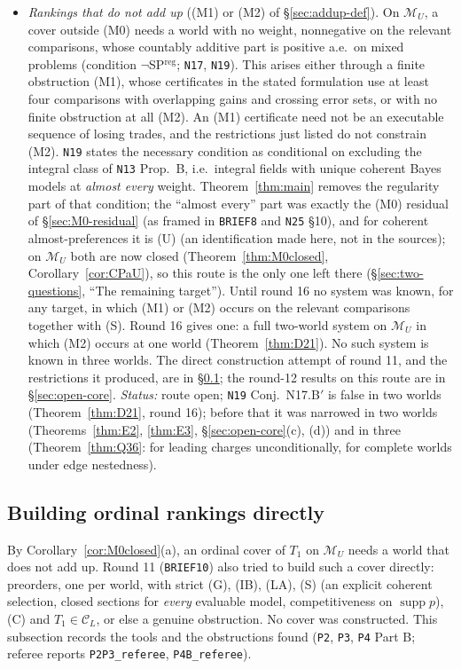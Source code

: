 \documentclass[11pt]{article}
\theoremstyle{definition}
\theoremstyle{remark}
\newcommand{\M}{\mathcal M}
\newcommand{\C}{\mathcal C}
\newcommand{\supp}{\operatorname{supp}}
\newcommand{\src}[1]{\texttt{#1}}
\begin{document}
\begin{itemize}[leftmargin=*]
\item \emph{Rankings that do not add up} ((M1) or (M2) of \S\ref{sec:addup-def}). On $\M_U$, a cover outside (M0) needs a world with no weight, nonnegative on the relevant comparisons, whose countably additive part is positive a.e.\ on mixed problems (condition $\neg$SP$^{\mathrm{reg}}$; \src{N17}, \src{N19}). This arises either through a finite obstruction (M1), whose certificates in the stated formulation use at least four comparisons with overlapping gains and crossing error sets, or with no finite obstruction at all (M2). An (M1) certificate need not be an executable sequence of losing trades, and the restrictions just listed do not constrain (M2). \src{N19} states the necessary condition as conditional on excluding the integral class of \src{N13} Prop.~B, i.e.\ integral fields with unique coherent Bayes models at \emph{almost every} weight. Theorem~\ref{thm:main} removes the regularity part of that condition; the ``almost every'' part was exactly the (M0) residual of \S\ref{sec:M0-residual} (as framed in \src{BRIEF8} and \src{N25} \S10), and for coherent almost-preferences it is (U) (an identification made here, not in the sources); on $\M_U$ both are now closed (Theorem~\ref{thm:M0closed}, Corollary~\ref{cor:CPaU}), so this route is the only one left there (\S\ref{sec:two-questions}, ``The remaining target''). Until round 16 no system was known, for any target, in which (M1) or (M2) occurs on the relevant comparisons together with (S). Round 16 gives one: a full two-world system on $\M_U$ in which (M2) occurs at one world (Theorem~\ref{thm:D21}). No such system is known in three worlds. The direct construction attempt of round 11, and the restrictions it produced, are in \S\ref{sec:open-ordinal}; the round-12 results on this route are in \S\ref{sec:open-core}. \emph{Status:} route open; \src{N19} Conj.~N17.B$'$ is false in two worlds (Theorem~\ref{thm:D21}, round 16); before that it was narrowed in two worlds (Theorems~\ref{thm:E2}, \ref{thm:E3}, \S\ref{sec:open-core}(c), (d)) and in three (Theorem~\ref{thm:Q36}: for leading charges unconditionally, for complete worlds under edge nestedness).
\end{itemize}

\subsection{Building ordinal rankings directly}\label{sec:open-ordinal}
By Corollary~\ref{cor:M0closed}(a), an ordinal cover of $T_1$ on $\M_U$ needs a world that does not add up. Round 11 (\src{BRIEF10}) also tried to build such a cover directly: preorders, one per world, with strict (G), (IB), (LA), (S) (an explicit coherent selection, closed sections for \emph{every} evaluable model, competitiveness on $\supp p$), (C) and $T_1\in\C_L$, or else a genuine obstruction. No cover was constructed. This subsection records the tools and the obstructions found (\src{P2}, \src{P3}, \src{P4} Part B; referee reports \src{P2P3\_referee}, \src{P4B\_referee}).
\end{document}
